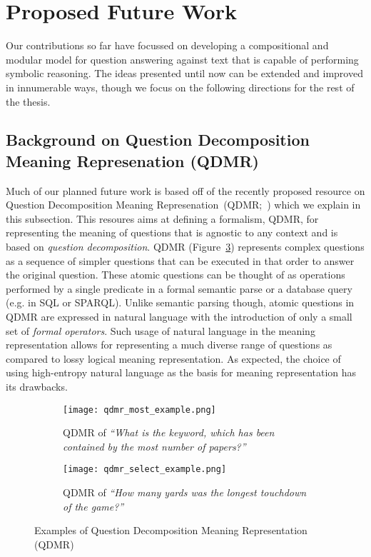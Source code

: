 \documentclass[main.tex]{subfiles}
\begin{document}
\section{Proposed Future Work} %
\label{sec:future}

Our contributions so far have focussed on developing a compositional and modular model for question answering against text that is capable of performing symbolic reasoning. The ideas presented until now can be extended and improved in innumerable ways, though we focus on the following directions for the rest of the thesis.

\subsection{Background on Question Decomposition Meaning Represenation (QDMR)}
Much of our planned future work is based off of the recently proposed resource on Question Decomposition Meaning Represenation~(QDMR;~) which we explain in this subsection.
This resoures aims at defining a formalism, QDMR, for representing the meaning of questions that is agnostic to any context and is based on \textit{question decomposition}.
QDMR (Figure~\ref{fig:qdmr_examples}) represents complex questions as a sequence of simpler questions that can be executed in that order to answer the original question.
These atomic questions can be thought of as operations performed by a single predicate in a formal semantic parse or a database query (e.g. in SQL or SPARQL).
Unlike semantic parsing though, atomic questions in QDMR are expressed in natural language with the introduction of only a small set of \textit{formal operators}.  Such usage of natural language in the meaning representation allows for representing a much diverse range of questions as compared to lossy logical meaning representation. As expected, the choice of using high-entropy natural language as the basis for meaning representation has its drawbacks.

\begin{figure}[b]
	\centering
    \begin{subfigure}[tb]{0.45\linewidth}
		\texttt{[image: qdmr\_most\_example.png]}
        \caption{QDMR of \textit{``What is the keyword, which has been contained by the most number of papers?''}}
		\label{fig:qdmr_most}
	\end{subfigure}
    \hfill
    \begin{subfigure}[tb]{0.45\linewidth}
		\texttt{[image: qdmr\_select\_example.png]}
		\caption{QDMR of \textit{``How many yards was the longest touchdown of the game?''}}
        \label{fig:qdmr_select}
    \end{subfigure}
	\caption{Examples of Question Decomposition Meaning Representation (QDMR)}
	\label{fig:qdmr_examples}
\end{figure}
\end{document}
